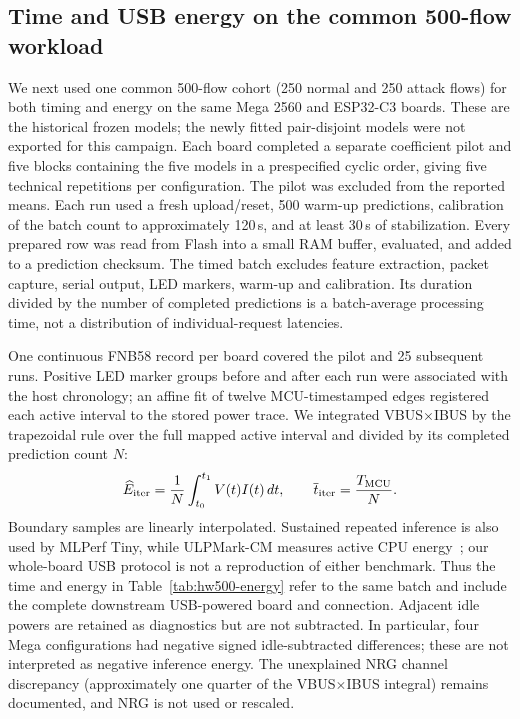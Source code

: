 \subsection{Time and USB energy on the common 500-flow workload}
\label{sec:hw500}
We next used one common 500-flow cohort (250 normal and 250 attack flows) for both timing and energy on the same Mega 2560 and ESP32-C3 boards. These are the historical frozen models; the newly fitted pair-disjoint models were not exported for this campaign. Each board completed a separate coefficient pilot and five blocks containing the five models in a prespecified cyclic order, giving five technical repetitions per configuration. The pilot was excluded from the reported means. Each run used a fresh upload/reset, 500 warm-up predictions, calibration of the batch count to approximately 120\,s, and at least 30\,s of stabilization. Every prepared row was read from Flash into a small RAM buffer, evaluated, and added to a prediction checksum. The timed batch excludes feature extraction, packet capture, serial output, LED markers, warm-up and calibration. Its duration divided by the number of completed predictions is a batch-average processing time, not a distribution of individual-request latencies.

One continuous FNB58 record per board covered the pilot and 25 subsequent runs. Positive LED marker groups before and after each run were associated with the host chronology; an affine fit of twelve MCU-timestamped edges registered each active interval to the stored power trace. We integrated VBUS$\times$IBUS by the trapezoidal rule over the full mapped active interval and divided by its completed prediction count $N$:
\begin{equation}
\widehat E_{\rm iter}=\frac{1}{N}\int_{t_0}^{t_1}V(t)I(t)\,dt,
\qquad \overline t_{\rm iter}=\frac{T_{\rm MCU}}{N}.
\label{eq:hw500-energy}
\end{equation}
Boundary samples are linearly interpolated. Sustained repeated inference is also used by MLPerf Tiny, while ULPMark-CM measures active CPU energy~\cite{Banbury2021MLPerfTiny,EEMBCULPMarkCM}; our whole-board USB protocol is not a reproduction of either benchmark. Thus the time and energy in Table~\ref{tab:hw500-energy} refer to the same batch and include the complete downstream USB-powered board and connection. Adjacent idle powers are retained as diagnostics but are not subtracted. In particular, four Mega configurations had negative signed idle-subtracted differences; these are not interpreted as negative inference energy. The unexplained NRG channel discrepancy (approximately one quarter of the VBUS$\times$IBUS integral) remains documented, and NRG is not used or rescaled.

